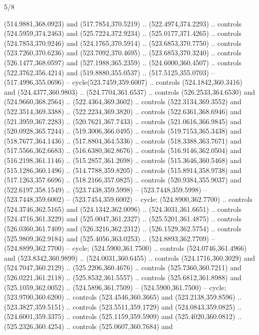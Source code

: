 \begin{flagdescription}{5/8}
\begin{scope}[shift={(0.5\flaglength,0.5\flagwidth)},scale=\flagwidth*\stretchfactor/820]
\begin{scope}[scale=1.84,xshift=-135mm,yshift=84mm]
\begin{scope}[y=0.80pt, x=0.80pt, yscale=-1, xscale=1]
\begin{scope}[cm={{1.01416,0.0,0.0,1.033,(-6.79641,-9.89449)}}]
\begin{scope}[cm={{-0.99823,-0.05944,-0.05944,0.99823,(979.09134,28.30472)}}]
\begin{scope}[draw=c6c301e,fill=cfab81c,line width=0.087\lw]
  (514.9881,368.0923) and (517.7854,370.5219) .. (522.4974,374.2293) .. controls
  (524.5959,374.2463) and (525.7224,372.9234) .. (525.0177,371.4265) .. controls
  (524.7853,370.9246) and (524.1765,370.5914) .. (523.6853,370.7750) .. controls
  (523.7260,370.6236) and (523.7092,370.4695) .. (523.6853,370.3240) .. controls
  (526.1477,368.0597) and (527.1988,365.2359) .. (524.6000,360.4507) .. controls
  (522.3762,356.4214) and (519.8880,355.0537) .. (517.5125,355.0703) --
  (517.4996,355.0696) -- cycle(523.7459,359.6007) .. controls
  (524.1842,360.3416) and (524.4377,360.9803) .. (524.7704,361.6537) .. controls
  (526.2533,364.6530) and (524.9660,368.2564) .. (522.4364,369.3602) .. controls
  (522.3134,369.3552) and (522.3514,369.3388) .. (522.2234,369.3820) .. controls
  (522.6361,368.6946) and (521.3959,367.2283) .. (520.7621,367.7433) .. controls
  (521.0616,366.9845) and (520.0928,365.7244) .. (519.3006,366.0495) .. controls
  (519.7153,365.3438) and (518.7677,364.1436) .. (517.8804,364.5336) .. controls
  (518.3388,363.7671) and (517.5566,362.6683) .. (516.6380,362.8676) .. controls
  (516.9146,362.0504) and (516.2198,361.1146) .. (515.2857,361.2698) .. controls
  (515.3646,360.5468) and (515.1286,360.1496) .. (514.7788,359.8205) .. controls
  (515.8914,358.9738) and (517.1263,357.6696) .. (518.2166,357.0825) .. controls
  (520.9384,355.9037) and (522.6197,358.1549) .. (523.7438,359.5998) --
  (523.7448,359.5998) -- (523.7448,359.6002) -- (523.7454,359.6002) -- cycle;
 (524.8900,362.7700) .. controls (524.3746,362.5165) and
  (524.1342,362.0096) .. (524.3031,361.6651) .. controls (524.4716,361.3229) and
  (525.0047,361.2327) .. (525.5201,361.4875) .. controls (526.0360,361.7409) and
  (526.3216,362.2312) .. (526.1529,362.5754) .. controls (525.9809,362.9184) and
  (525.4056,363.0253) .. (524.8893,362.7709) -- (524.8899,362.7700) -- cycle;
 (524.5900,361.7500) .. controls (524.0746,361.4966) and
  (523.8342,360.9899) .. (524.0031,360.6455) .. controls (524.1716,360.3029) and
  (524.7047,360.2129) .. (525.2206,360.4676) .. controls (525.7360,360.7211) and
  (526.0221,361.2118) .. (525.8532,361.5557) .. controls (525.6812,361.8988) and
  (525.1059,362.0052) .. (524.5896,361.7509) -- (524.5900,361.7500) -- cycle;
 (523.9700,360.6200) .. controls (523.4546,360.3665) and
  (523.2138,359.8596) .. (523.3827,359.5151) .. controls (523.5511,359.1729) and
  (524.0843,359.0825) .. (524.6001,359.3375) .. controls (525.1159,359.5909) and
  (525.4020,360.0812) .. (525.2326,360.4254) .. controls (525.0607,360.7684) and

\end{scope}
\end{scope}
\end{scope}
\end{scope}
\end{scope}
\end{scope}
\end{flagdescription}
